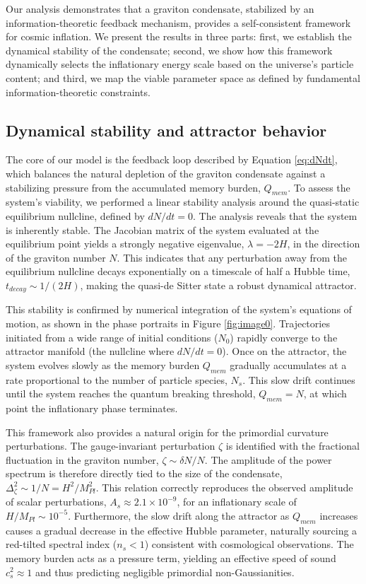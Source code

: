 \documentclass[]{article}
\begin{document}
Our analysis demonstrates that a graviton condensate, stabilized by an information-theoretic feedback mechanism, provides a self-consistent framework for cosmic inflation. We present the results in three parts: first, we establish the dynamical stability of the condensate; second, we show how this framework dynamically selects the inflationary energy scale based on the universe's particle content; and third, we map the viable parameter space as defined by fundamental information-theoretic constraints.

\subsection{Dynamical stability and attractor behavior}
The core of our model is the feedback loop described by Equation \ref{eq:dNdt}, which balances the natural depletion of the graviton condensate against a stabilizing pressure from the accumulated memory burden, $Q_{mem}$. To assess the system's viability, we performed a linear stability analysis around the quasi-static equilibrium nullcline, defined by $dN/dt = 0$. The analysis reveals that the system is inherently stable. The Jacobian matrix of the system evaluated at the equilibrium point yields a strongly negative eigenvalue, $\lambda = -2H$, in the direction of the graviton number $N$. This indicates that any perturbation away from the equilibrium nullcline decays exponentially on a timescale of half a Hubble time, $t_{decay} \sim 1/(2H)$, making the quasi-de Sitter state a robust dynamical attractor.

This stability is confirmed by numerical integration of the system's equations of motion, as shown in the phase portraits in Figure \ref{fig:image0}. Trajectories initiated from a wide range of initial conditions ($N_0$) rapidly converge to the attractor manifold (the nullcline where $dN/dt=0$). Once on the attractor, the system evolves slowly as the memory burden $Q_{mem}$ gradually accumulates at a rate proportional to the number of particle species, $N_s$. This slow drift continues until the system reaches the quantum breaking threshold, $Q_{mem} = N$, at which point the inflationary phase terminates.

This framework also provides a natural origin for the primordial curvature perturbations. The gauge-invariant perturbation $\zeta$ is identified with the fractional fluctuation in the graviton number, $\zeta \sim \delta N/N$. The amplitude of the power spectrum is therefore directly tied to the size of the condensate, $\Delta_\zeta^2 \sim 1/N = H^2/M_{Pl}^2$. This relation correctly reproduces the observed amplitude of scalar perturbations, $A_s \approx 2.1 \times 10^{-9}$, for an inflationary scale of $H/M_{Pl} \sim 10^{-5}$. Furthermore, the slow drift along the attractor as $Q_{mem}$ increases causes a gradual decrease in the effective Hubble parameter, naturally sourcing a red-tilted spectral index ($n_s < 1$) consistent with cosmological observations. The memory burden acts as a pressure term, yielding an effective speed of sound $c_s^2 \approx 1$ and thus predicting negligible primordial non-Gaussianities.
\end{document}
